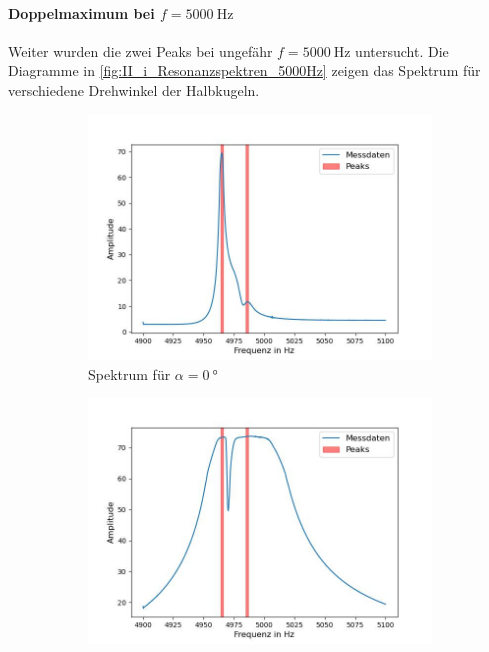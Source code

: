 \documentclass[../main.tex]{subfiles}
\begin{document}
\paragraph{Doppelmaximum bei $f=\SI{5000}{\hertz}$}
    Weiter wurden die zwei Peaks bei ungefähr $f=\SI{5000}{\hertz}$ untersucht. Die Diagramme in \ref{fig:II_i_Resonanzspektren_5000Hz} zeigen das Spektrum für verschiedene Drehwinkel der Halbkugeln.

    \begin{figure}[H]
        \centering
        \begin{subfigure}[b]{0.45\textwidth}
            \centering
            \includegraphics[width=\textwidth]{Bilddateien/Auswertung/II_i_Resonanzspektrum_0_Grad.jpg}
            \caption{Spektrum für $\alpha=\SI{0}{\degree}$}
            \label{fig:II_i_Resonanzspektrum_0_Grad}
        \end{subfigure}
        \hfill
        \begin{subfigure}[b]{0.45\textwidth}
            \centering
            \includegraphics[width=\textwidth]{Bilddateien/Auswertung/II_i_Resonanzspektrum_90_Grad.jpg}

\end{subfigure}
\end{figure}
\end{document}
